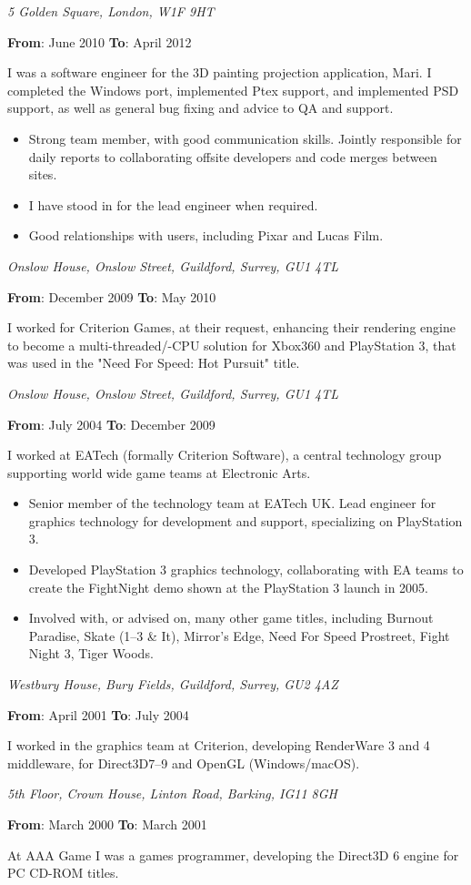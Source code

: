 \documentclass[a4paper,12pt]{article}
\newcommand{\place}[2]{\vspace*{1ex}{\noindent\bf #1}\hfill{\it #2}\par}
\newcommand{\fromto}[2]{{\bf From}: #1 {\bf To}: #2\par}
\begin{document}
\place{The Foundry VisionMongers Ltd}{5 Golden Square, London, W1F 9HT}
\fromto{June 2010}{April 2012}
I was a software engineer for the 3D painting projection application, Mari. I completed the Windows port, implemented Ptex support, and implemented PSD support, as well as general bug fixing and advice to QA and support.
\begin{itemize}
\item Strong team member, with good communication skills. Jointly responsible for daily reports to collaborating offsite developers and code merges between sites.
\item I have stood in for the lead engineer when required.
\item Good relationships with users, including Pixar and Lucas Film.
\end{itemize}

\place{Electronic Arts}{Onslow House, Onslow Street, Guildford, Surrey, GU1 4TL}
\fromto{December 2009}{May 2010}
I worked for Criterion Games, at their request, enhancing their rendering engine to become a multi-threaded/-CPU solution for Xbox360 and PlayStation 3, that was used in the "Need For Speed: Hot Pursuit" title.

\place{Electronic Arts}{Onslow House, Onslow Street, Guildford, Surrey, GU1 4TL}
\fromto{July 2004}{December 2009}
I worked at EATech (formally Criterion Software), a central technology group supporting world wide game teams at Electronic Arts.
\begin{itemize}
\item Senior member of the technology team at EATech UK. Lead engineer for graphics technology for development and support, specializing on PlayStation 3.
\item Developed PlayStation 3 graphics technology, collaborating with EA teams to create the FightNight demo shown at the PlayStation 3 launch in 2005.
\item Involved with, or advised on, many other game titles, including Burnout Paradise, Skate (1--3 \& It), Mirror's Edge, Need For Speed Prostreet, Fight Night 3, Tiger Woods.
\end{itemize}

\place{Criterion Software}{Westbury House, Bury Fields, Guildford, Surrey, GU2 4AZ}
\fromto{April 2001}{July 2004}
I worked in the graphics team at Criterion, developing RenderWare 3 and 4 middleware, for Direct3D7--9 and OpenGL (Windows/macOS).

\place{AAA Game}{5th Floor, Crown House, Linton Road, Barking, IG11 8GH}
\fromto{March 2000}{March 2001}
At AAA Game I was a games programmer, developing the Direct3D 6 engine for PC CD-ROM titles.
\end{document}
